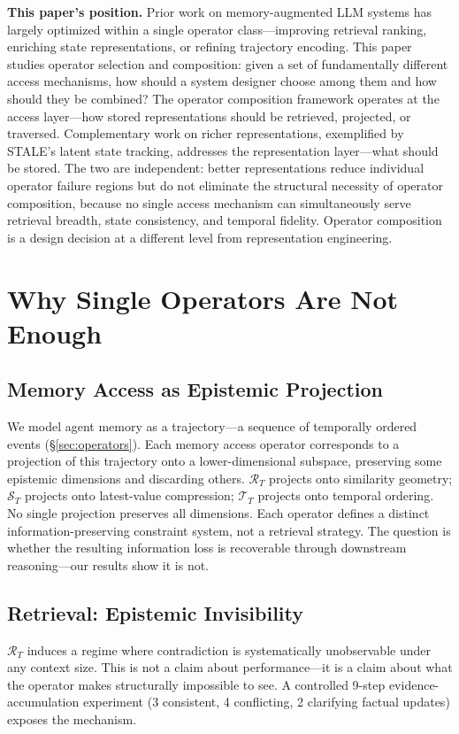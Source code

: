 \documentclass[letterpaper,twocolumn,10pt]{article}
\begin{document}
\textbf{This paper's position.} Prior work on memory-augmented LLM systems has largely optimized within a single operator class---improving retrieval ranking, enriching state representations, or refining trajectory encoding. This paper studies operator selection and composition: given a set of fundamentally different access mechanisms, how should a system designer choose among them and how should they be combined? The operator composition framework operates at the access layer---how stored representations should be retrieved, projected, or traversed. Complementary work on richer representations, exemplified by STALE's latent state tracking, addresses the representation layer---what should be stored. The two are independent: better representations reduce individual operator failure regions but do not eliminate the structural necessity of operator composition, because no single access mechanism can simultaneously serve retrieval breadth, state consistency, and temporal fidelity. Operator composition is a design decision at a different level from representation engineering.

\section{Why Single Operators Are Not Enough}
\label{sec:why-not}

\subsection{Memory Access as Epistemic Projection}
We model agent memory as a trajectory---a sequence of temporally ordered events (\S\ref{sec:operators}). Each memory access operator corresponds to a projection of this trajectory onto a lower-dimensional subspace, preserving some epistemic dimensions and discarding others. $\mathcal{R}_T$ projects onto similarity geometry; $\mathcal{S}_T$ projects onto latest-value compression; $\mathcal{T}_T$ projects onto temporal ordering. No single projection preserves all dimensions. Each operator defines a distinct information-preserving constraint system, not a retrieval strategy. The question is whether the resulting information loss is recoverable through downstream reasoning---our results show it is not.

\subsection{Retrieval: Epistemic Invisibility}
$\mathcal{R}_T$ induces a regime where contradiction is systematically unobservable under any context size. This is not a claim about performance---it is a claim about what the operator makes structurally impossible to see. A controlled 9-step evidence-accumulation experiment (3 consistent, 4 conflicting, 2 clarifying factual updates) exposes the mechanism.
\end{document}
